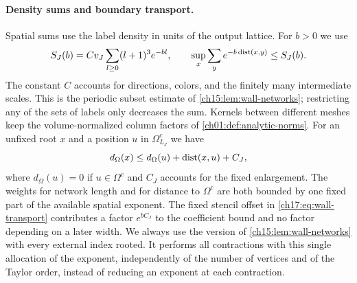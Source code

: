 \paragraph{Density sums and boundary transport.}
Spatial sums use the label density in units of the output lattice. For $b>0$ we use
\begin{equation}\label{ch17:eq:density-sum}
 S_J(b)=Cv_J\sum_{l\ge0}(l+1)^3e^{-bl},\qquad
 \sup_x\sum_y e^{-b\operatorname{dist}(x,y)}\le S_J(b).
\end{equation}
The constant $C$ accounts for directions, colors, and the finitely many intermediate scales. This is the periodic subset estimate of \cref{ch15:lem:wall-networks}; restricting any of the sets of labels only decreases the sum. Kernels between different meshes keep the volume-normalized column factors of \cref{ch01:def:analytic-norms}. For an unfixed root $x$ and a position $u$ in $\Omega^c_{L_J}$ we have
\begin{equation}\label{ch17:eq:wall-transport}
 d_\Omega(x)\le d_\Omega(u)+\operatorname{dist}(x,u)+C_J,
\end{equation}
where $d_\Omega(u)=0$ if $u\in \Omega^c$ and $C_J$ accounts for the fixed enlargement. The weights for network length and for distance to $\Omega^c$ are both bounded by one fixed part of the available spatial exponent. The fixed stencil offset in \eqref{ch17:eq:wall-transport} contributes a factor $e^{bC_J}$ to the coefficient bound and no factor depending on a later width. We always use the version of \cref{ch15:lem:wall-networks} with every external index rooted. It performs all contractions with this single allocation of the exponent, independently of the number of vertices and of the Taylor order, instead of reducing an exponent at each contraction.


